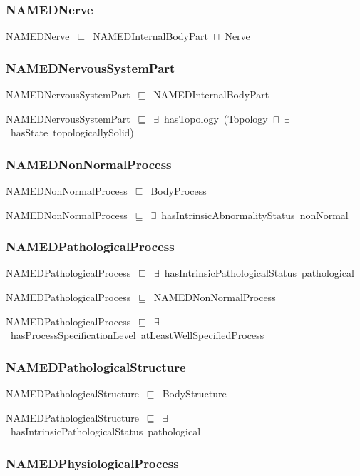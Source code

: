 \documentclass{article}
\begin{document}
\subsubsection*{NAMEDNerve}

NAMEDNerve~\ensuremath{\sqsubseteq}~NAMEDInternalBodyPart~\ensuremath{\sqcap}~Nerve~

\subsubsection*{NAMEDNervousSystemPart}

NAMEDNervousSystemPart~\ensuremath{\sqsubseteq}~NAMEDInternalBodyPart~

NAMEDNervousSystemPart~\ensuremath{\sqsubseteq}~\ensuremath{\exists}~hasTopology~(Topology~\ensuremath{\sqcap}~\ensuremath{\exists}~hasState~topologicallySolid)~

\subsubsection*{NAMEDNonNormalProcess}

NAMEDNonNormalProcess~\ensuremath{\sqsubseteq}~BodyProcess~

NAMEDNonNormalProcess~\ensuremath{\sqsubseteq}~\ensuremath{\exists}~hasIntrinsicAbnormalityStatus~nonNormal~

\subsubsection*{NAMEDPathologicalProcess}

NAMEDPathologicalProcess~\ensuremath{\sqsubseteq}~\ensuremath{\exists}~hasIntrinsicPathologicalStatus~pathological~

NAMEDPathologicalProcess~\ensuremath{\sqsubseteq}~NAMEDNonNormalProcess~

NAMEDPathologicalProcess~\ensuremath{\sqsubseteq}~\ensuremath{\exists}~hasProcessSpecificationLevel~atLeastWellSpecifiedProcess~

\subsubsection*{NAMEDPathologicalStructure}

NAMEDPathologicalStructure~\ensuremath{\sqsubseteq}~BodyStructure~

NAMEDPathologicalStructure~\ensuremath{\sqsubseteq}~\ensuremath{\exists}~hasIntrinsicPathologicalStatus~pathological~

\subsubsection*{NAMEDPhysiologicalProcess}
\end{document}

